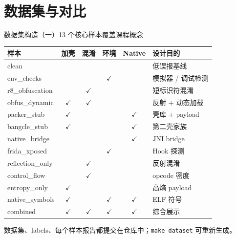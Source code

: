 \documentclass[10pt,aspectratio=169]{beamer}
\newcommand{\hitick}{{\color{PineGreen}\Large$\checkmark$}}
\begin{document}
\section{数据集与对比}

\begin{frame}{数据集构造（一）}{13 个核心样本覆盖课程概念}
  \tiny
  \setlength{\tabcolsep}{2pt}
  \renewcommand{\arraystretch}{0.75}
  \begin{table}
    \centering
    \begin{tabular}{@{}lccccp{3.15cm}@{}}
      \toprule
      样本 & 加壳 & 混淆 & 环境 & Native & 设计目的 \\
      \midrule
      clean & & & & & 低误报基线 \\
      env\_checks & & & \hitick & & 模拟器 / 调试检测 \\
      r8\_obfuscation & & \hitick & & & 短标识符混淆 \\
      obfus\_dynamic & \hitick & \hitick & & & 反射 + 动态加载 \\
      packer\_stub & \hitick & & & \hitick & 壳库 + payload \\
      bangcle\_stub & \hitick & & & \hitick & 第二壳家族 \\
      native\_bridge & & & & \hitick & JNI bridge \\
      frida\_xposed & & & \hitick & & Hook 探测 \\
      reflection\_only & & \hitick & & & 反射混淆 \\
      control\_flow & & \hitick & & & opcode 密度 \\
      entropy\_only & \hitick & & & & 高熵 payload \\
      native\_symbols & \hitick & & \hitick & \hitick & ELF 符号 \\
      combined & \hitick & \hitick & \hitick & \hitick & 综合展示 \\
      \bottomrule
    \end{tabular}
  \end{table}
  \vspace{0.2em}
  数据集、labels、每个样本报告都提交在仓库中；\texttt{make dataset} 可重新生成。
\end{frame}
\end{document}
